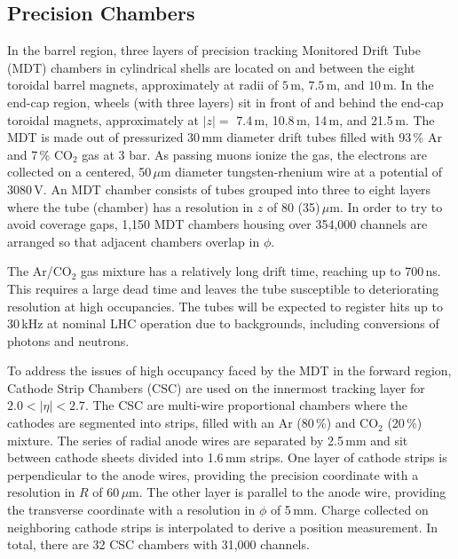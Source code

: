 \subsection{Precision Chambers}
In the barrel region, three layers of precision tracking Monitored Drift Tube (MDT) chambers in cylindrical shells are located on and between the eight toroidal barrel magnets, approximately at radii of $5$\,m, $7.5$\,m, and $10$\,m. In the end-cap region, wheels (with three layers) sit in front of and behind the end-cap toroidal magnets, approximately at $|z| =$ 7.4\,m, 10.8\,m, 14\,m, and 21.5\,m. The MDT is made out of pressurized 30\,mm diameter drift tubes filled with 93\,\% Ar and 7\,\% CO$_2$ gas at 3 bar. As passing muons ionize the gas, the electrons are collected on a centered, 50\,$\mu$m diameter tungsten-rhenium wire at a potential of 3080\,V. An MDT chamber consists of tubes grouped into three to eight layers where the tube (chamber) has a resolution in $z$ of 80 (35)\,$\mu$m. In order to try to avoid coverage gaps, 1,150 MDT chambers housing over 354,000 channels are arranged so that adjacent chambers overlap in $\phi$.

The Ar/CO$_2$ gas mixture has a relatively long drift time, reaching up to 700\,ns. This requires a large dead time
and leaves the tube susceptible to deteriorating resolution at high occupancies.
The tubes will be expected to register hits up to 30\,kHz at nominal LHC operation due to backgrounds, including conversions of photons and neutrons.

To address the issues of high occupancy faced by the MDT in the forward region, Cathode Strip Chambers (CSC) are used on the innermost tracking layer for $2.0<|\eta|<2.7$. The CSC are multi-wire proportional chambers where the cathodes are segmented into strips, filled with an Ar (80\,\%) and CO$_2$ (20\,\%) mixture. The series of radial anode wires are separated by 2.5\,mm and sit between cathode sheets divided into 1.6\,mm strips. One layer of cathode strips is perpendicular to the anode wires, providing the precision coordinate with a resolution in $R$ of 60\,$\mu$m. The other layer is parallel to the anode wire, providing the transverse coordinate with a resolution in $\phi$ of 5\,mm. Charge collected on neighboring cathode strips is interpolated to derive a position measurement. In total, there are 32 CSC chambers with 31,000 channels.

